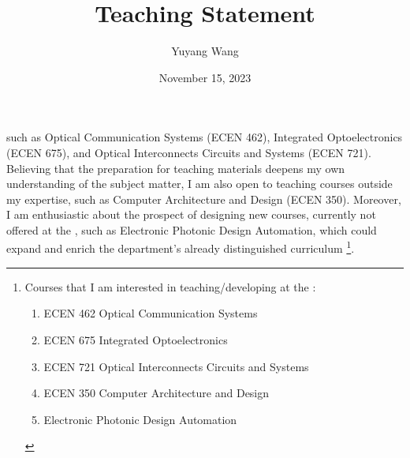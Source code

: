 



\title{Teaching Statement}

\def\courseOneName{Optical Communication Systems}
\def\courseOneNumber{ECEN 462}
\def\courseTwoName{Integrated Optoelectronics}
\def\courseTwoNumber{ECEN 675}
\def\courseThreeName{Optical Interconnects Circuits and Systems}
\def\courseThreeNumber{ECEN 721}
\def\courseFourName{Computer Architecture and Design}
\def\courseFourNumber{ECEN 350}
\def\courseSixName{Electronic Photonic Design Automation}

\def\rsCustom{%
such as \courseOneName{} (\courseOneNumber{}), \courseTwoName{} (\courseTwoNumber{}), and \courseThreeName{} (\courseThreeNumber{}). Believing that the preparation for teaching materials deepens my own understanding of the subject matter, I am also open to teaching courses outside my expertise, such as \courseFourName{} (\courseFourNumber{}). Moreover, I am enthusiastic about the prospect of designing new courses, currently not offered at the \appSchool{}, such as \courseSixName{}, which could expand and enrich the department's already distinguished curriculum%
\footnote[][-1.6in]{%
Courses that I am interested in teaching/developing at the \appDept{}:
\begin{enumerate}
    \item \courseOneNumber{} \courseOneName{}
    \item \courseTwoNumber{} \courseTwoName{}
    \item \courseThreeNumber{} \courseThreeName{}
    \item \courseFourNumber{} \courseFourName{}
    \item \courseSixName{}
\end{enumerate}
}.
}

\author{Yuyang Wang}
\date{November 15, 2023}
\makeatletter
\fancyfoot[L]{\scshape \MakeLowercase{\@author}}
\fancyfoot[R]{{\scshape \MakeLowercase{\@title}}\quad{\fontsize{16}{20}\selectfont\sfrac{\thepage}{\pageref*{LastPage}}}\hspace{0.25in}}
\makeatother



\maketitle%


\rsCustom{}


\footnotesize
{}

